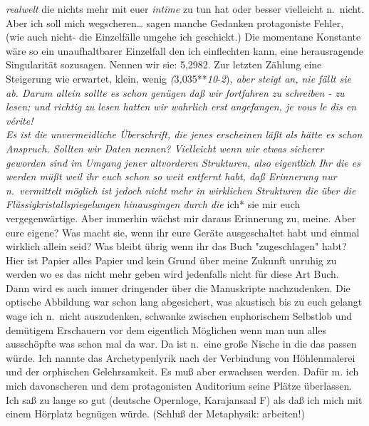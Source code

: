 \documentclass[
]{article}
\begin{document}
\emph{realwelt} die nichts mehr mit euer \emph{intime} zu tun hat oder
besser vielleicht n.~nicht. Aber ich soll mich wegscheren\ldots{} sagen
manche Gedanken protagoniste Fehler, (wie auch nicht- die Einzelfälle
umgehe ich geschickt.) Die momentane Konstante wäre so ein
unaufhaltbarer Einzelfall den ich einflechten kann, eine herausragende
Singularität sozusagen. Nennen wir sie: 5,2982. Zur letzten Zählung eine
Steigerung wie erwartet, klein, wenig
\emph{(}3\emph{,}035**\emph{10}-\emph{2})\emph{, aber steigt an, nie
fällt sie ab. Darum allein sollte es schon genügen daß wir fortfahren zu
schreiben - zu lesen; und richtig zu lesen hatten wir wahrlich erst
angefangen, je vous le dis en vérite!\\
Es ist die unvermeidliche Überschrift, die jenes erscheinen läßt als
hätte es schon Anspruch. Sollten wir Daten nennen? Vielleicht wenn wir
etwas sicherer geworden sind im Umgang jener altvorderen Strukturen,
also eigentlich Ihr die es werden müßt weil ihr euch schon so weit
entfernt habt, daß Erinnerung nur n.~vermittelt möglich ist jedoch nicht
mehr in wirklichen Strukturen die über die Flüssigkristallspiegelungen
hinausgingen durch die }ich* sie mir euch vergegenwärtige. Aber immerhin
wächst mir daraus Erinnerung zu, meine. Aber eure eigene? Was macht sie,
wenn ihr eure Geräte ausgeschaltet habt und einmal wirklich allein seid?
Was bleibt übrig wenn ihr das Buch "zugeschlagen" habt? Hier ist Papier
alles Papier und kein Grund über meine Zukunft unruhig zu werden wo es
das nicht mehr geben wird jedenfalls nicht für diese Art Buch.\\
Dann wird es auch immer dringender über die Manuskripte nachzudenken.
Die optische Abbildung war schon lang abgesichert, was akustisch bis zu
euch gelangt wage ich n.~nicht auszudenken, schwanke zwischen
euphorischem Selbstlob und demütigem Erschauern vor dem eigentlich
Möglichen wenn man nun alles ausschöpfte was schon mal da war. Da ist
n.~eine große Nische in die das passen würde. Ich nannte das
Archetypenlyrik nach der Verbindung von Höhlenmalerei und der orphischen
Gelehrsamkeit. Es muß aber erwachsen werden. Dafür m. ich mich
davonscheren und dem protagonisten Auditorium seine Plätze überlassen.
Ich saß zu lange so gut (deutsche Opernloge, Karajansaal F) als daß ich
mich mit einem Hörplatz begnügen würde. (Schluß der Metaphysik:
arbeiten!)
\end{document}
